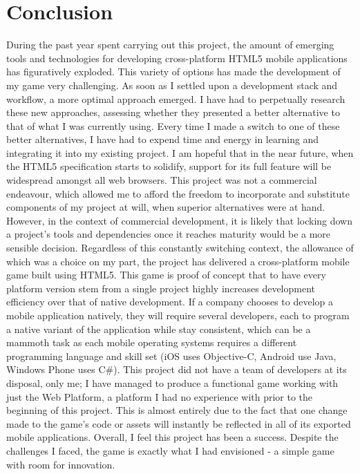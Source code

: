 \documentclass[final]{cmpreport}
\begin{document}
\section{Conclusion}
During the past year spent carrying out this project, the amount of emerging tools and technologies for developing cross-platform HTML5 mobile applications has figuratively exploded. This variety of options has made the development of my game very challenging. As soon as I settled upon a development stack and workflow, a more optimal approach emerged. I have had to perpetually research these new approaches, assessing whether they presented a better alternative to that of what I was currently using. Every time I made a switch to one of these better alternatives, I have had to expend time and energy in learning and integrating it into my existing project. I am hopeful that in the near future, when the HTML5 specification starts to solidify, support for its full feature will be widespread amongst all web browsers. This project was not a commercial endeavour, which allowed me to afford the freedom to incorporate and substitute components of my project at will, when superior alternatives were at hand. However, in the context of commercial development, it is likely that locking down a project's tools and dependencies once it reaches maturity would be a more sensible decision. Regardless of this constantly switching context, the allowance of which was a choice on my part, the project has delivered a cross-platform mobile game built using HTML5. This game is proof of concept that to have every platform version stem from a single project highly increases development efficiency over that of native development. If a company chooses to develop a mobile application natively, they will require several developers, each to program a native variant of the application while stay consistent, which can be a mammoth task as each mobile operating systems requires a different programming language and skill set (iOS uses Objective-C, Android use Java, Windows Phone uses C\#). This project did not have a team of developers at its disposal, only me; I have managed to produce a functional game working with just the Web Platform, a platform I had no experience with prior to the beginning of this project. This is almost entirely due to the fact that one change made to the game's code or assets will instantly be reflected in all of its exported mobile applications. Overall, I feel this project has been a success. Despite the challenges I faced, the game is exactly what I had envisioned - a simple game with room for innovation.
\end{document}
